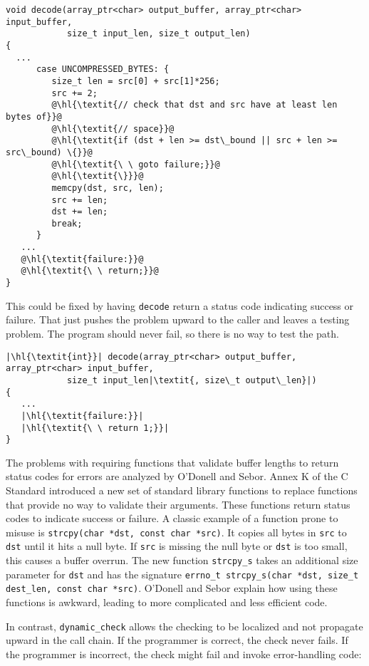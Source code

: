 \begin{lstlisting}[escapechar=\@]
void decode(array_ptr<char> output_buffer, array_ptr<char> input_buffer,
            size_t input_len, size_t output_len)
{
  ...
      case UNCOMPRESSED_BYTES: {
         size_t len = src[0] + src[1]*256;
         src += 2;
         @\hl{\textit{// check that dst and src have at least len bytes of}}@
         @\hl{\textit{// space}}@
         @\hl{\textit{if (dst + len >= dst\_bound || src + len >= src\_bound) \{}}@
         @\hl{\textit{\ \ goto failure;}}@
         @\hl{\textit{\}}}@
         memcpy(dst, src, len);
         src += len;
         dst += len;
         break;
      }
   ...
   @\hl{\textit{failure:}}@
   @\hl{\textit{\ \ return;}}@
}
\end{lstlisting}

This could be fixed by having \lstinline+decode+ return a status code
indicating success or failure. That just pushes the problem upward to
the caller and leaves a testing problem. The program should never fail,
so there is no way to test the path.

\begin{lstlisting}[escapechar=\|]
|\hl{\textit{int}}| decode(array_ptr<char> output_buffer, array_ptr<char> input_buffer,
            size_t input_len|\textit{, size\_t output\_len}|)
{
   ...
   |\hl{\textit{failure:}}|
   |\hl{\textit{\ \ return 1;}}|
}
\end{lstlisting}

The problems with requiring functions that validate buffer lengths to
return status codes for errors are analyzed by O'Donell and Sebor\cite{ODonell2015}.
Annex K of the C Standard \cite{ISO2011} introduced a new set of standard library functions to replace
functions that provide no way to validate their arguments. These
functions return status codes to indicate success or failure. A classic
example of a function prone to misuse is
\lstinline+strcpy(char *dst, const char *src)+.
It copies all bytes in \lstinline+src+ to \lstinline+dst+ until
it hits a null byte. If \lstinline+src+ is missing the null byte or
\lstinline+dst+ is too small, this causes a buffer overrun. The new
function \lstinline+strcpy_s+ takes an additional size parameter for
\lstinline+dst+ and has the signature
\lstinline+errno_t strcpy_s(char *dst, size_t dest_len, const char *src)+.
O'Donell and Sebor explain how
using these functions is awkward, leading to more complicated and less
efficient code.

In contrast, \lstinline+dynamic_check+ allows the checking to be localized
and not propagate upward in the call chain. If the programmer is
correct, the check never fails. If the programmer is incorrect, the
check might fail and invoke error-handling code:

